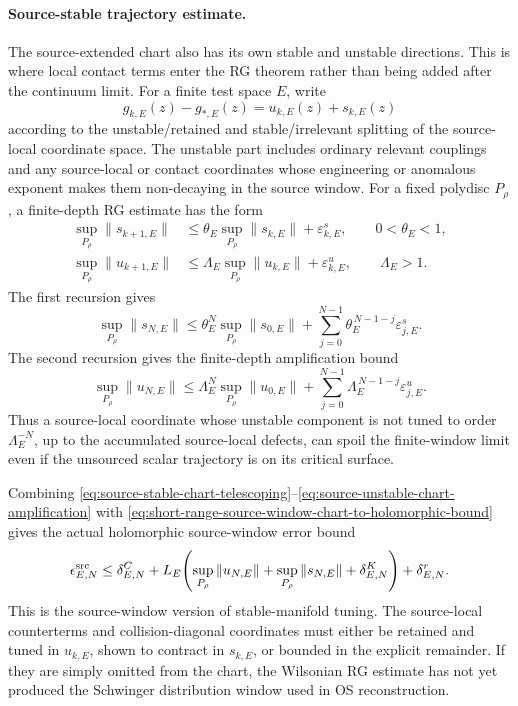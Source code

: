 \paragraph{Source-stable trajectory estimate.}
The source-extended chart also has its own stable and unstable directions.
This is where local contact terms enter the RG theorem rather than being
added after the continuum limit.  For a finite test space \(E\), write
\[
  g_{k,E}(z)-g_{\ast,E}(z)
  =
  u_{k,E}(z)+s_{k,E}(z)
\]
according to the unstable/retained and stable/irrelevant splitting of the
source-local coordinate space.  The unstable part includes ordinary
relevant couplings and any source-local or contact coordinates whose
engineering or anomalous exponent makes them non-decaying in the source
window.  For a fixed polydisc \(P_\rho\), a finite-depth RG estimate has the
form
\begin{align}
  \sup_{P_\rho}\|s_{k+1,E}\|
  &\le
  \theta_E\sup_{P_\rho}\|s_{k,E}\|+\varepsilon^s_{k,E},
  \qquad 0<\theta_E<1,
  \label{eq:source-stable-chart-recursion}\\
  \sup_{P_\rho}\|u_{k+1,E}\|
  &\le
  \Lambda_E\sup_{P_\rho}\|u_{k,E}\|+\varepsilon^u_{k,E},
  \qquad \Lambda_E>1 .
  \label{eq:source-unstable-chart-recursion}
\end{align}
The first recursion gives
\begin{equation}
  \sup_{P_\rho}\|s_{N,E}\|
  \le
  \theta_E^N\sup_{P_\rho}\|s_{0,E}\|
  +
  \sum_{j=0}^{N-1}\theta_E^{\,N-1-j}\varepsilon^s_{j,E}.
  \label{eq:source-stable-chart-telescoping}
\end{equation}
The second recursion gives the finite-depth amplification bound
\begin{equation}
  \sup_{P_\rho}\|u_{N,E}\|
  \le
  \Lambda_E^N\sup_{P_\rho}\|u_{0,E}\|
  +
  \sum_{j=0}^{N-1}\Lambda_E^{\,N-1-j}\varepsilon^u_{j,E}.
  \label{eq:source-unstable-chart-amplification}
\end{equation}
Thus a source-local coordinate whose unstable component is not tuned to
order \(\Lambda_E^{-N}\), up to the accumulated source-local defects, can
spoil the finite-window limit even if the unsourced scalar trajectory is on
its critical surface.

Combining
\eqref{eq:source-stable-chart-telescoping}--\eqref{eq:source-unstable-chart-amplification}
with
\eqref{eq:short-range-source-window-chart-to-holomorphic-bound} gives the
actual holomorphic source-window error bound
\begin{equation}
  \epsilon_{E,N}^{\rm src}
  \le
  \delta^C_{E,N}
  +
  L_E\!\left(
    \sup_{P_\rho}\|u_{N,E}\|
    +
    \sup_{P_\rho}\|s_{N,E}\|
    +
    \delta^K_{E,N}
  \right)
  +
  \delta^r_{E,N}.
  \label{eq:source-stable-chart-to-window-bound}
\end{equation}
This is the source-window version of stable-manifold tuning.  The
source-local counterterms and collision-diagonal coordinates must either be
retained and tuned in \(u_{k,E}\), shown to contract in \(s_{k,E}\), or
bounded in the explicit remainder.  If they are simply omitted from the
chart, the Wilsonian RG estimate has not yet produced the Schwinger
distribution window used in OS reconstruction.

